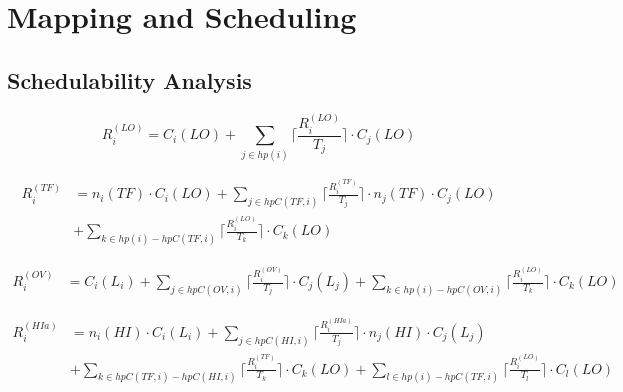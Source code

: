 
\chapter{Mapping and Scheduling} %

\label{c:sched} %


\section{Schedulability Analysis}



\begin{equation}
R_i^{(LO)}= C_i(LO)+\sum_{j \in hp(i)}\Big\lceil\frac{R_i^{(LO)}}{T_j}\Big\rceil \cdot C_j(LO)
\label{eq:lomode}
\end{equation}

\begin{equation}\label{eq:tfmode}
\begin{aligned}
R_i^{(TF)} & = n_i(TF) \cdot C_i(LO)
+\sum_{j \in hpC(TF,i)}\Big\lceil\frac{R_i^{(TF)}}{T_j}\Big\rceil \cdot n_j(TF) \cdot C_j(LO) \\
&  +\sum_{k \in hp(i)-hpC(TF,i)}\Big\lceil\frac{R_i^{(LO)}}{T_k}\Big\rceil \cdot C_k(LO)
\end{aligned}
\end{equation}

\begin{equation}\label{eq:ovmode}
\begin{aligned}
R_i^{(OV)} &  = C_i(L_i)+\sum_{j \in hpC(OV,i)}\Big\lceil\frac{R_i^{(OV)}}{T_j}\Big\rceil \cdot C_j(L_j) 
 +\sum_{k \in hp(i)-hpC(OV,i)}\Big\lceil\frac{R_i^{(LO)}}{T_k}\Big\rceil \cdot C_k(LO)
\end{aligned}
\end{equation}


\begin{equation}\label{eq:hitfmode}
\begin{aligned}
R_i^{(HIa)} & = n_i(HI) \cdot C_i(L_i) 
  +\sum_{j \in hpC(HI,i)}\Big\lceil\frac{R_i^{(HIa)}}{T_j}\Big\rceil \cdot n_j(HI) \cdot C_j(L_j) \\
&  +\sum_{k \in hpC(TF,i)-hpC(HI,i)}\Big\lceil\frac{R_i^{(TF)}}{T_k}\Big\rceil \cdot C_k(LO)
  +\sum_{l \in hp(i)-hpC(TF,i)}\Big\lceil\frac{R_i^{(LO)}}{T_l}\Big\rceil \cdot C_l(LO)
\end{aligned}
\end{equation}

